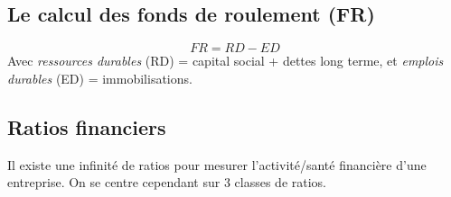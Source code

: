 \documentclass[12pt,oneside,a4paper]{article}
\begin{document}

\subsection{Le calcul des fonds de roulement (FR)} %
\label{sub:le_calcul_des_fonds_de_roulement_}

\[
	FR= RD-ED
\]
Avec \emph{ressources durables} (RD) = capital social + dettes long terme, et \emph{emplois durables} (ED) = immobilisations.

\subsection{Ratios financiers} %
\label{sub:ratios_financiers}

Il existe une infinité de ratios pour mesurer l'activité/santé financière d'une entreprise. On se centre cependant sur 3 classes de ratios.
\end{document}
